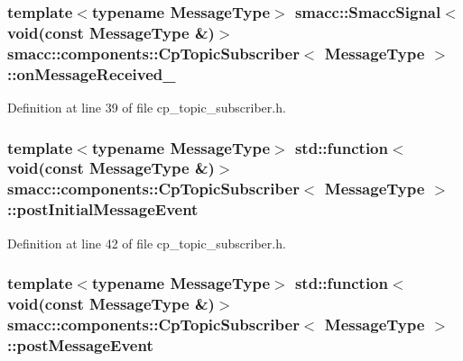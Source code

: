 \subsubsection[{\texorpdfstring{on\+Message\+Received\+\_\+}{onMessageReceived_}}]{\setlength{\rightskip}{0pt plus 5cm}template$<$typename Message\+Type$>$ {\bf smacc\+::\+Smacc\+Signal}$<$void(const Message\+Type \&)$>$ {\bf smacc\+::components\+::\+Cp\+Topic\+Subscriber}$<$ Message\+Type $>$\+::on\+Message\+Received\+\_\+}\hypertarget{classsmacc_1_1components_1_1CpTopicSubscriber_aeec04e64cad880bd49d401c2a474c6e9}{}\label{classsmacc_1_1components_1_1CpTopicSubscriber_aeec04e64cad880bd49d401c2a474c6e9}


Definition at line 39 of file cp\+\_\+topic\+\_\+subscriber.\+h.

\subsubsection[{\texorpdfstring{post\+Initial\+Message\+Event}{postInitialMessageEvent}}]{\setlength{\rightskip}{0pt plus 5cm}template$<$typename Message\+Type$>$ std\+::function$<$void(const Message\+Type \&)$>$ {\bf smacc\+::components\+::\+Cp\+Topic\+Subscriber}$<$ Message\+Type $>$\+::post\+Initial\+Message\+Event}\hypertarget{classsmacc_1_1components_1_1CpTopicSubscriber_a9e1c210ebc8d5ef0c837e8bd9b83f754}{}\label{classsmacc_1_1components_1_1CpTopicSubscriber_a9e1c210ebc8d5ef0c837e8bd9b83f754}


Definition at line 42 of file cp\+\_\+topic\+\_\+subscriber.\+h.

\subsubsection[{\texorpdfstring{post\+Message\+Event}{postMessageEvent}}]{\setlength{\rightskip}{0pt plus 5cm}template$<$typename Message\+Type$>$ std\+::function$<$void(const Message\+Type \&)$>$ {\bf smacc\+::components\+::\+Cp\+Topic\+Subscriber}$<$ Message\+Type $>$\+::post\+Message\+Event}\hypertarget{classsmacc_1_1components_1_1CpTopicSubscriber_a002ca59f74f784f14597d1c0e057d298}{}\label{classsmacc_1_1components_1_1CpTopicSubscriber_a002ca59f74f784f14597d1c0e057d298}



